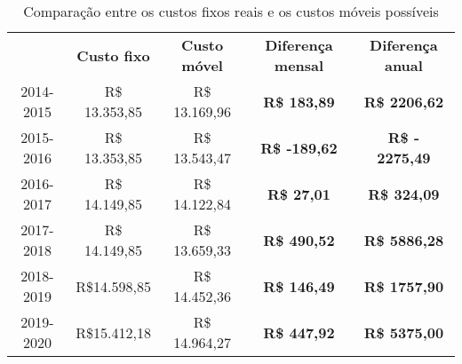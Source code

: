 \begin{table}[htbp]
  \centering
  \caption{Comparação entre os custos fixos reais e os custos móveis possíveis}
\begin{tabular}{ccccc}
	\rowcolor[rgb]{ .969,  .588,  .275} \multicolumn{1}{p{7.545em}}{\textcolor[rgb]{ 1,  1,  1}{\textbf{Período}}} & \multicolumn{1}{p{7.545em}}{\textcolor[rgb]{ 1,  1,  1}{\textbf{Custo fixo}}} & \multicolumn{1}{p{7.545em}}{\textcolor[rgb]{ 1,  1,  1}{\textbf{Custo móvel}}} & \multicolumn{1}{p{7.545em}}{\textcolor[rgb]{ 1,  1,  1}{\textbf{Diferença mensal}}} & \multicolumn{1}{p{7.545em}}{\textcolor[rgb]{ 1,  1,  1}{\textbf{Diferença anual}}} \\
	\rowcolor[rgb]{ .992,  .914,  .851} 2014-2015 & R\$ 13.353,85 & R\$ 13.169,96 & \textcolor[rgb]{ 1,  0,  0}{\textbf{R\$ 183,89}} & \textcolor[rgb]{ 1,  0,  0}{\textbf{R\$ 2206,62}} \\
	\rowcolor[rgb]{ .984,  .831,  .706} 2015-2016 & R\$ 13.353,85 & R\$ 13.543,47 & \textcolor[rgb]{ 0,  .69,  .314}{\textbf{R\$ -189,62}} & \textcolor[rgb]{ 0,  .69,  .314}{\textbf{R\$ - 2275,49}} \\
	\rowcolor[rgb]{ .992,  .914,  .851} 2016-2017 & R\$ 14.149,85 & R\$ 14.122,84 & \textcolor[rgb]{ 1,  0,  0}{\textbf{R\$ 27,01}} & \textcolor[rgb]{ 1,  0,  0}{\textbf{R\$ 324,09}} \\
	\rowcolor[rgb]{ .984,  .831,  .706} 2017-2018 & R\$ 14.149,85 & R\$ 13.659,33 & \textcolor[rgb]{ 1,  0,  0}{\textbf{R\$ 490,52}} & \textcolor[rgb]{ 1,  0,  0}{\textbf{R\$ 5886,28}} \\
	\rowcolor[rgb]{ .992,  .914,  .851} 2018-2019 & R\$14.598,85 & R\$ 14.452,36 & \textcolor[rgb]{ 1,  0,  0}{\textbf{R\$ 146,49}} & \textcolor[rgb]{ 1,  0,  0}{\textbf{R\$ 1757,90}} \\
	\rowcolor[rgb]{ .984,  .831,  .706} 2019-2020 & R\$15.412,18 & R\$ 14.964,27 & \textcolor[rgb]{ 1,  0,  0}{\textbf{R\$ 447,92}} & \textcolor[rgb]{ 1,  0,  0}{\textbf{R\$ 5375,00}} \\
\end{tabular}%
  \label{tab:custos_comparativo}%
\end{table}%
